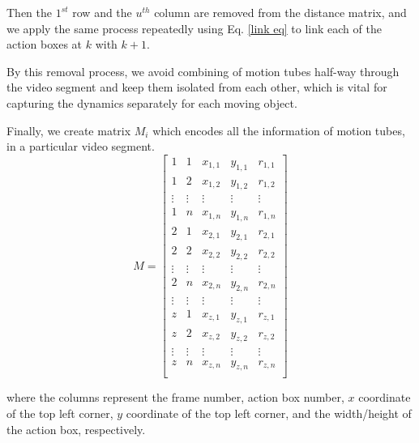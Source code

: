 Then the $1^{st}$ row and the $u^{th}$ column are removed from the distance matrix, and we apply the same process repeatedly using Eq. \ref{link eq}
to link each of the action boxes at $k$ with $k+1$.

By this removal process, we avoid combining of motion tubes half-way through
the video segment and keep them isolated from each other, which is vital for capturing the dynamics separately for each moving object.




Finally, we create matrix $M_{i}$ which encodes all the information of motion tubes, in a particular video segment.
\begin{equation}
M=\begin{bmatrix}
    1       & 1 & x_{1,1} & y_{1,1} & r_{1,1} \\
    1       & 2 & x_{1,2} & y_{1,2} & r_{1,2} \\
    \vdots       & \vdots & \vdots & \vdots & \vdots \\
    1       & n & x_{1,n} & y_{1,n} & r_{1,n} \\
    2       & 1 & x_{2,1} & y_{2,1} & r_{2,1} \\
    2       & 2 & x_{2,2} & y_{2,2} & r_{2,2} \\
    \vdots       & \vdots & \vdots & \vdots & \vdots \\
    2       & n & x_{2,n} & y_{2,n} & r_{2,n} \\
    \vdots       & \vdots & \vdots & \vdots & \vdots \\
    z       & 1 & x_{z,1} & y_{z,1} & r_{z,1} \\
    z       & 2 & x_{z,2} & y_{z,2} & r_{z,2} \\
    \vdots       & \vdots & \vdots & \vdots & \vdots \\
    z       & n & x_{z,n} & y_{z,n} & r_{z,n} \\

\end{bmatrix}
\end{equation}

where the columns represent the frame number, action box number, $x$ coordinate of the top left corner,
$y$ coordinate of the top left corner, and the width/height of the action box, respectively.

